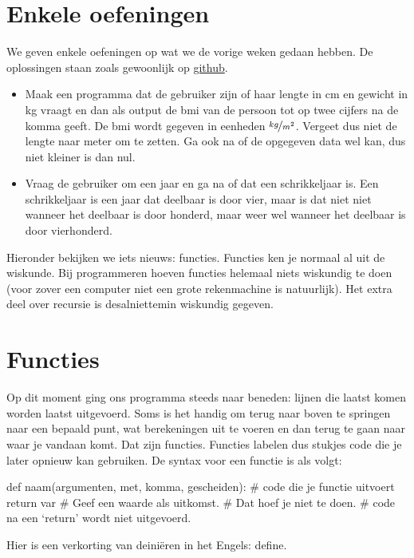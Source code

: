 \section*{Enkele oefeningen}
  We geven enkele oefeningen op wat we de vorige weken gedaan hebben. De
  oplossingen staan zoals gewoonlijk op
  \href{https://github.com/TGThorax/python-ka2ring/tree/master/src}{github}.
  \begin{itemize}
  \item Maak een programma dat de gebruiker zijn of haar lengte in cm en gewicht
    in kg vraagt en dan als output de bmi van de persoon tot op twee cijfers na
    de komma geeft. De bmi wordt gegeven in eenheden $\nicefrac{kg}{m^2}$.
    Vergeet dus niet de lengte naar meter om te zetten. Ga ook na of de
    opgegeven data wel kan, dus niet kleiner is dan nul.
  \item Vraag de gebruiker om een jaar en ga na of dat een schrikkeljaar is.
    Een schrikkeljaar is een jaar dat deelbaar is door vier, maar is dat niet
    niet wanneer het deelbaar is door honderd, maar weer wel wanneer het
    deelbaar is door vierhonderd.
  \end{itemize}
  Hieronder bekijken we iets nieuws: functies. Functies ken je normaal al uit de
  wiskunde. Bij programmeren hoeven functies helemaal niets wiskundig te
  doen (voor zover een computer niet een grote rekenmachine is natuurlijk). Het
  extra deel over recursie is desalniettemin wiskundig gegeven.
\section{Functies}
  Op dit moment ging ons programma steeds naar beneden: lijnen die laatst
  komen worden laatst uitgevoerd. Soms is het handig om terug naar boven te
  springen naar een bepaald punt, wat berekeningen uit te voeren en dan terug
  te gaan naar waar je vandaan komt. Dat zijn functies. Functies labelen dus
  stukjes code die je later opnieuw kan gebruiken. De syntax voor een functie
  is als volgt:
  \begin{python}
    def naam(argumenten, met, komma, gescheiden):
      # code die je functie uitvoert
      return var # Geef een waarde als uitkomst.
                 # Dat hoef je niet te doen.
      # code na een `return' wordt niet uitgevoerd.
  \end{python}
  Hier is  een verkorting van deini\"eren in het Engels: define.

